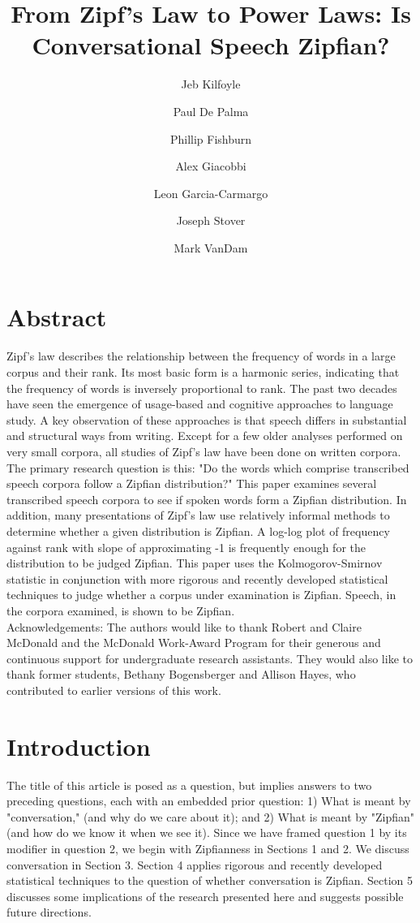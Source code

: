 \documentclass[12pt]{article}
\title{From Zipf's Law to Power Laws: Is Conversational Speech Zipfian?}
\author[1]{Jeb Kilfoyle}
\author[2]{Paul De Palma}
\author[2]{Phillip Fishburn}
\author[2]{Alex Giacobbi}
\author[2] {Leon Garcia-Carmargo}
\author[3]{Joseph Stover}
\author[4]{Mark VanDam}
\affil[1]{Department of Computer Science, University of New Mexico}
\affil[2]{Department of Computer Science, Gonzaga University}
\affil[3]{Department of Mathematics, Gonzaga University}
\affil[4]{Department of Speech and Hearing Sciences, Washington State University}
\begin{document}
\maketitle  %
\section*{\centering\large Abstract}
\noindent Zipf's law describes the relationship between the frequency of words in a large corpus and their rank.  Its most basic form is a harmonic series, indicating that the frequency of words is inversely proportional to rank.  The past two decades have seen the emergence of usage-based and cognitive approaches to language study.  A key observation of these approaches is that speech differs in substantial and structural ways from writing.  Except for a few older analyses performed on very small corpora, all studies of Zipf's law have been done on written corpora.  The primary research question is this: "Do the words which comprise transcribed speech corpora follow a Zipfian distribution?"  This paper examines several transcribed speech corpora to see if spoken words form a Zipfian distribution.  In addition, many presentations of Zipf's law use relatively informal methods to determine whether a given distribution is Zipfian.  A log-log plot of frequency against rank with slope of approximating -1 is frequently enough for the distribution to be judged Zipfian.  This paper uses the Kolmogorov-Smirnov statistic in conjunction with more rigorous and recently developed statistical techniques to judge whether a corpus under examination is Zipfian. Speech, in the corpora examined, is shown to be Zipfian.\\

\noindent Acknowledgements: The authors would like to thank Robert and Claire McDonald and the McDonald Work-Award Program for their generous and continuous support for undergraduate research assistants.  They would also like to thank former students, Bethany Bogensberger and Allison Hayes, who contributed to earlier versions of this work. 

\section{Introduction}

The title of this article is posed as a question, but implies answers to two preceding questions, each with an embedded prior question: 1) What is meant by "conversation," (and why do we care about it); and 2) What is meant by "Zipfian" (and how do we know it when we see it).  Since we have framed question 1 by its modifier in question 2, we begin with Zipfianness in Sections 1 and 2.  We discuss conversation in Section 3.  Section 4 applies rigorous and recently developed statistical techniques to the question of whether conversation is Zipfian.  Section 5 discusses some implications of the research presented here and suggests possible future directions.  
\end{document}
